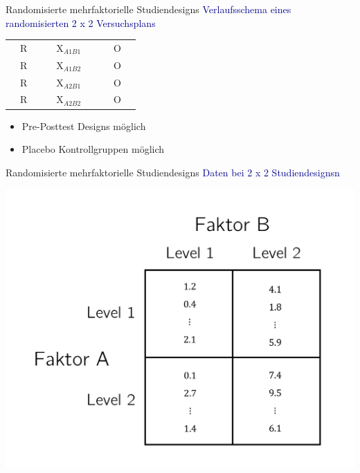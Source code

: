 \documentclass[
  8pt,
  ignorenonframetext,
]{beamer}
\providecommand{\tightlist}{%
  \setlength{\itemsep}{0pt}\setlength{\parskip}{0pt}}
\begin{document}
\begin{frame}{Randomisierte mehrfaktorielle Studiendesigns}
\protect\hypertarget{randomisierte-mehrfaktorielle-studiendesigns-4}{}
\textcolor{darkblue}{Verlaufsschema eines randomisierten 2 x 2 Versuchsplans}
\vspace{1cm}

\center
\large
\begin{tabular}{|clc|}
\hline
$\quad$R$\quad$  & $\quad$X$_{A1B1}$ $\quad$ & $\quad$O$\quad$
\\
$\quad$R$\quad$  & $\quad$X$_{A1B2}$ $\quad$ & $\quad$O$\quad$
\\
$\quad$R$\quad$  & $\quad$X$_{A2B1}$ $\quad$ & $\quad$O$\quad$
\\
$\quad$R$\quad$  & $\quad$X$_{A2B2}$ $\quad$ & $\quad$O$\quad$
\\\hline
\end{tabular}
\vspace{1cm}

\normalsize
{}

\begin{itemize}
\tightlist
\item
  Pre-Posttest Designs möglich
\item
  Placebo Kontrollgruppen möglich
\end{itemize}
\end{frame}

\begin{frame}{Randomisierte mehrfaktorielle Studiendesigns}
\protect\hypertarget{randomisierte-mehrfaktorielle-studiendesigns-5}{}
\textcolor{darkblue}{Daten bei 2 x 2 Studiendesignsn}

\begin{center}\includegraphics[width=0.7\linewidth]{8_Abbildungen/alm_8_zweifaktorielle_va_konzept} \end{center}
\end{frame}
\end{document}
